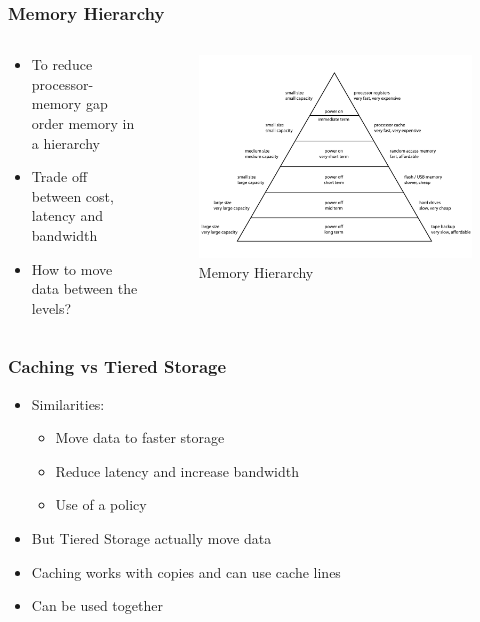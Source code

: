 \documentclass[
	aspectratio=169,
	compress,
]{beamer}
\newcommand{\navframetitle}[1]{\frametitle{#1\hfill{\footnotesize\lastsection{}}}}
\begin{document}
\begin{frame}
	\navframetitle{Memory Hierarchy}

	\begin{columns}
		\begin{column}{0.5\textwidth}
			\begin{itemize}
				\item To reduce processor-memory gap order memory in a hierarchy
				\item Trade off between cost, latency and bandwidth
				\item How to move data between the levels? 
			\end{itemize}
		\end{column}
		\begin{column}{0.5\textwidth}
			\begin{figure}[ht]
    			\centering
    			\includegraphics[scale=0.3]{ComputerMemoryHierarchy.pdf}
    			\caption{Memory Hierarchy \cite{wikiMemoryHierarchy}}
        		\label{fig:memory hierarchy}
			\end{figure}
		\end{column}
	\end{columns}
\end{frame}

\begin{frame}
	\navframetitle{Caching vs Tiered Storage}
	
	\begin{itemize}
		\item Similarities:
		\begin{itemize}
			\item Move data to faster storage 			
			\item Reduce latency and increase bandwidth
			\item Use of a policy  
		\end{itemize}		 
		\item But Tiered Storage actually move data
		\item Caching works with copies and can use cache lines
		\item Can be used together
	\end{itemize}
\end{frame}
\end{document}
